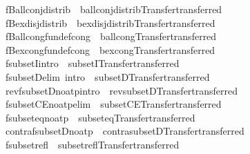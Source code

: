 \begin{isabellebody}
\isamarkupfalse%
\ fBall{\isacharunderscore}conj{\isacharunderscore}distrib\ {\isacharequal}\ ball{\isacharunderscore}conj{\isacharunderscore}distrib{\isacharbrackleft}Transfer{\isachardot}transferred{\isacharbrackright}\isanewline
{}\isamarkupfalse%
\ fBex{\isacharunderscore}disj{\isacharunderscore}distrib\ {\isacharequal}\ bex{\isacharunderscore}disj{\isacharunderscore}distrib{\isacharbrackleft}Transfer{\isachardot}transferred{\isacharbrackright}\isanewline
{}\isamarkupfalse%
\ fBall{\isacharunderscore}cong{\isacharbrackleft}fundef{\isacharunderscore}cong{\isacharbrackright}\ {\isacharequal}\ ball{\isacharunderscore}cong{\isacharbrackleft}Transfer{\isachardot}transferred{\isacharbrackright}\isanewline
{}\isamarkupfalse%
\ fBex{\isacharunderscore}cong{\isacharbrackleft}fundef{\isacharunderscore}cong{\isacharbrackright}\ {\isacharequal}\ bex{\isacharunderscore}cong{\isacharbrackleft}Transfer{\isachardot}transferred{\isacharbrackright}\isanewline
{}\isamarkupfalse%
\ fsubsetI{\isacharbrackleft}intro{\isacharbang}{\isacharbrackright}\ {\isacharequal}\ subsetI{\isacharbrackleft}Transfer{\isachardot}transferred{\isacharbrackright}\isanewline
{}\isamarkupfalse%
\ fsubsetD{\isacharbrackleft}elim{\isacharcomma}\ intro{\isacharquery}{\isacharbrackright}\ {\isacharequal}\ subsetD{\isacharbrackleft}Transfer{\isachardot}transferred{\isacharbrackright}\isanewline
{}\isamarkupfalse%
\ rev{\isacharunderscore}fsubsetD{\isacharbrackleft}no{\isacharunderscore}atp{\isacharcomma}intro{\isacharquery}{\isacharbrackright}\ {\isacharequal}\ rev{\isacharunderscore}subsetD{\isacharbrackleft}Transfer{\isachardot}transferred{\isacharbrackright}\isanewline
{}\isamarkupfalse%
\ fsubsetCE{\isacharbrackleft}no{\isacharunderscore}atp{\isacharcomma}elim{\isacharbrackright}\ {\isacharequal}\ subsetCE{\isacharbrackleft}Transfer{\isachardot}transferred{\isacharbrackright}\isanewline
{}\isamarkupfalse%
\ fsubset{\isacharunderscore}eq{\isacharbrackleft}no{\isacharunderscore}atp{\isacharbrackright}\ {\isacharequal}\ subset{\isacharunderscore}eq{\isacharbrackleft}Transfer{\isachardot}transferred{\isacharbrackright}\isanewline
{}\isamarkupfalse%
\ contra{\isacharunderscore}fsubsetD{\isacharbrackleft}no{\isacharunderscore}atp{\isacharbrackright}\ {\isacharequal}\ contra{\isacharunderscore}subsetD{\isacharbrackleft}Transfer{\isachardot}transferred{\isacharbrackright}\isanewline
{}\isamarkupfalse%
\ fsubset{\isacharunderscore}refl\ {\isacharequal}\ subset{\isacharunderscore}refl{\isacharbrackleft}Transfer{\isachardot}transferred{\isacharbrackright}\isanewline

\end{isabellebody}
